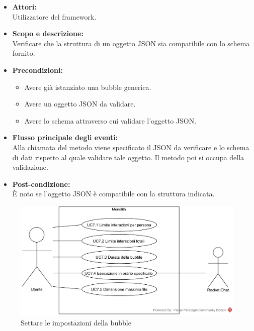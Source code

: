 \begin{itemize}
	\item \textbf{Attori:}
	\\Utilizzatore del framework.
	\item \textbf{Scopo e descrizione:} 
	\\Verificare che la struttura di un oggetto JSON sia compatibile con lo schema fornito.
	\item \textbf{Precondizioni:}
	\begin{itemize}
		\item Avere già istanziato una bubble generica.
		\item Avere un oggetto JSON da validare.
		\item Avere lo schema attraverso cui validare l'oggetto JSON.
	\end{itemize}
	\item \textbf{Flusso principale degli eventi:}
	\\Alla chiamata del metodo viene specificato il JSON da verificare e lo schema di dati rispetto al quale validare tale oggetto. Il metodo poi si occupa della validazione.
	\item \textbf{Post-condizione:}
	\\È noto se l'oggetto JSON è compatibile con la struttura indicata.
\end{itemize}

\begin{figure}[H]
	\centering
	\includegraphics[width=15cm]{../../documenti/AnalisiDeiRequisiti/Diagrammi_img/usecase/Impostazioni.png}
	\caption{\UCCaption{} Settare le impostazioni della bubble}
\end{figure}

